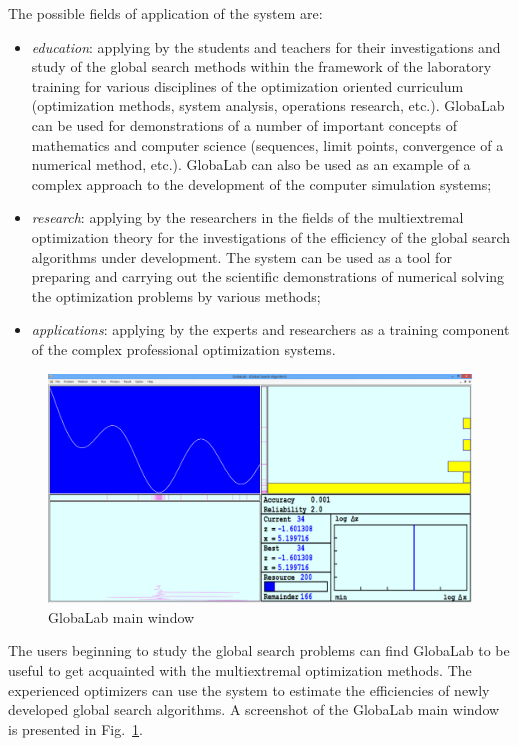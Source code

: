 The possible fields of application of the system are:
\begin{itemize}
\item \textit{education}: applying by the students and teachers for their investigations and study of the global search methods within the framework of the laboratory training for various disciplines of the optimization oriented curriculum (optimization methods, system analysis, operations research, etc.). GlobaLab can be used for demonstrations of a number of important concepts of mathematics and computer science (sequences, limit points, convergence of a numerical method, etc.). GlobaLab can also be used as an example of a complex approach to the development of the computer simulation systems;

\item \textit{research}: applying by the researchers in the fields of the multiextremal optimization theory for the investigations of the efficiency of the global search algorithms under development. The system can be used as a tool for preparing and carrying out the scientific demonstrations of numerical solving the optimization problems by various methods;

\item \textit{applications}: applying by the experts and researchers as a training component of the complex professional optimization systems.
\end{itemize}

\begin{figure}[t]
\includegraphics[width=1.0\linewidth]{figures/7_1.png}
\caption{GlobaLab main window}
\label{7_fig_1}     
\end{figure}

The users beginning to study the global search problems can find GlobaLab to be useful to get acquainted with the multiextremal optimization methods. The experienced optimizers can use the system to estimate the efficiencies of newly developed global search algorithms. A screenshot of the GlobaLab main window is presented in Fig.~\ref{7_fig_1}.

